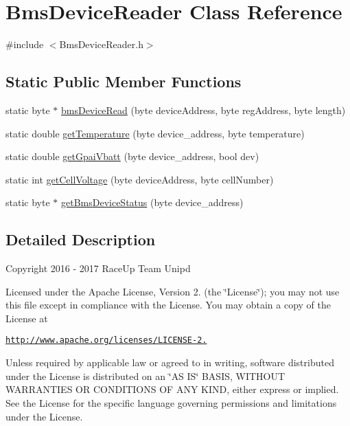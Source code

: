 \hypertarget{class_bms_device_reader}{}\section{Bms\+Device\+Reader Class Reference}
\label{class_bms_device_reader}


{\ttfamily \#include $<$Bms\+Device\+Reader.\+h$>$}

\subsection*{Static Public Member Functions}
\begin{DoxyCompactItemize}
\item 
static byte $\ast$ \hyperlink{class_bms_device_reader_a1f714eea255931c0f36af3e305412c1e}{bms\+Device\+Read} (byte device\+Address, byte reg\+Address, byte length)
\item 
static double \hyperlink{class_bms_device_reader_adbae5620c7b0fc99a4ca4f858f8e0445}{get\+Temperature} (byte device\+\_\+address, byte temperature)
\item 
static double \hyperlink{class_bms_device_reader_a6c5950b69bd1c4c9481cfb9dae5eddcd}{get\+Gpai\+Vbatt} (byte device\+\_\+address, bool dev)
\item 
static int \hyperlink{class_bms_device_reader_a6419c01acb3752a22909248b089ed883}{get\+Cell\+Voltage} (byte device\+Address, byte cell\+Number)
\item 
static byte $\ast$ \hyperlink{class_bms_device_reader_a7acf8a5b5bca22c7e968d90deaaebffc}{get\+Bms\+Device\+Status} (byte device\+\_\+address)
\end{DoxyCompactItemize}


\subsection{Detailed Description}
Copyright 2016 -\/ 2017 Race\+Up Team Unipd

Licensed under the Apache License, Version 2. (the \char`\"{}\+License\char`\"{}); you may not use this file except in compliance with the License. You may obtain a copy of the License at

\href{http://www.apache.org/licenses/LICENSE-2.0}{\tt http\+://www.\+apache.\+org/licenses/\+L\+I\+C\+E\+N\+S\+E-\/2.}

Unless required by applicable law or agreed to in writing, software distributed under the License is distributed on an \char`\"{}\+A\+S I\+S\char`\"{} B\+A\+S\+IS, W\+I\+T\+H\+O\+UT W\+A\+R\+R\+A\+N\+T\+I\+ES OR C\+O\+N\+D\+I\+T\+I\+O\+NS OF A\+NY K\+I\+ND, either express or implied. See the License for the specific language governing permissions and limitations under the License. 

